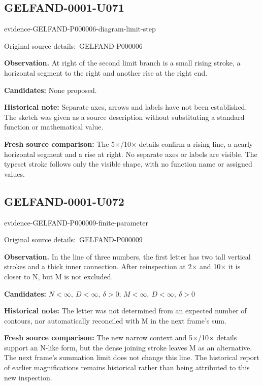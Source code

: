 \documentclass[11pt]{article}
\newcommand{\EvidenceBlock}[4]{%
 \par\smallskip\noindent\begin{minipage}{\linewidth}
 \begin{minipage}[t]{.47\linewidth}\vspace{0pt}\centering
 \csname evidence-#1-#2\endcsname\par
 {\scriptsize\SourceCropCaption\ #1}\par
 \end{minipage}\hfill
 \begin{minipage}[t]{.49\linewidth}\vspace{0pt}\raggedright
 {\small\color{orange!65!black}\textbf{#4} #3}\par
 \end{minipage}
 \end{minipage}\par\smallskip}
\newcommand{\SourceCropCaption}{Original source details:}\newcommand{\ReadingCaption}{Uncertain reading.}\newcommand{\IncompleteCaption}{Undeciphered passage.}\newcommand{\DiagramCaption}{Diagram and typed description.}
\begin{document}
\subsection*{GELFAND-0001-U071}
\EvidenceBlock{GELFAND-P000006}{diagram-limit-step}{At right of the second limit branch is a small rising stroke, a horizontal segment to the right and another rise at the right end.}{Observation.}
\par\smallskip\noindent\textbf{Candidates: } None proposed.\par
\par\smallskip\noindent\textbf{Historical note: } Separate axes, arrows and labels have not been established. The sketch was given as a source description without substituting a standard function or mathematical value.\par
\par\smallskip\noindent\textbf{Fresh source comparison: } The 5×/10× details confirm a rising line, a nearly horizontal segment and a rise at right. No separate axes or labels are visible. The typeset stroke follows only the visible shape, with no function name or assigned values.\par

\subsection*{GELFAND-0001-U072}
\EvidenceBlock{GELFAND-P000009}{finite-parameter}{In the line of three numbers, the first letter has two tall vertical strokes and a thick inner connection. After reinspection at 2× and 10× it is closer to N, but M is not excluded.}{Observation.}
\par\smallskip\noindent\textbf{Candidates: } \(N<\infty,\ D<\infty,\ \delta>0\); \(M<\infty,\ D<\infty,\ \delta>0\)\par
\par\smallskip\noindent\textbf{Historical note: } The letter was not determined from an expected number of contours, nor automatically reconciled with M in the next frame’s sum.\par
\par\smallskip\noindent\textbf{Fresh source comparison: } The new narrow context and 5×/10× details support an N-like form, but the dense joining stroke leaves M as an alternative. The next frame’s summation limit does not change this line. The historical report of earlier magnifications remains historical rather than being attributed to this new inspection.\par
\end{document}
